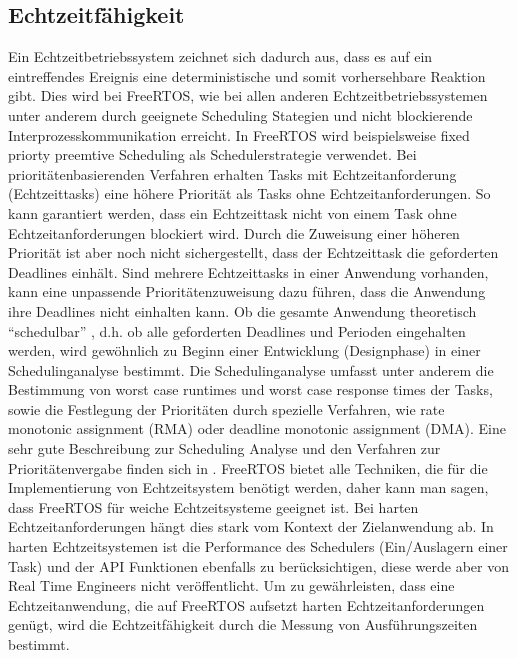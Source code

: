 \subsection{Echtzeitfähigkeit}
Ein Echtzeitbetriebssystem zeichnet sich dadurch aus, dass es auf ein eintreffendes Ereignis eine deterministische und somit vorhersehbare Reaktion gibt. Dies wird bei FreeRTOS, wie bei allen anderen Echtzeitbetriebssystemen unter anderem durch geeignete Scheduling Stategien und nicht blockierende Interprozesskommunikation erreicht\cite{9780128015070}\cite{Jones:1997:CRT:269005.266689}\cite{Regehr:2001:ACR:882481.883779}. In FreeRTOS wird beispielsweise fixed priorty preemtive Scheduling als Schedulerstrategie verwendet. Bei prioritätenbasierenden Verfahren erhalten Tasks mit Echtzeitanforderung (Echtzeittasks) eine höhere Priorität als Tasks ohne Echtzeitanforderungen. So kann garantiert werden, dass ein Echtzeittask nicht von einem Task ohne Echtzeitanforderungen blockiert wird. Durch die Zuweisung einer höheren Priorität ist aber noch nicht sichergestellt, dass der Echtzeittask die geforderten Deadlines einhält. Sind mehrere Echtzeittasks in einer Anwendung vorhanden, kann eine unpassende Prioritätenzuweisung dazu füh\-ren, dass die Anwendung ihre Deadlines nicht einhalten kann\cite{9780128015070}. Ob die gesamte Anwendung theoretisch "`schedulbar"' , d.h. ob alle geforderten Deadlines und Perioden eingehalten werden, wird gewöhnlich zu Beginn einer Entwicklung (Designphase) in einer Schedulinganalyse bestimmt. Die Schedulinganalyse umfasst unter anderem die Bestimmung von worst case runtimes und worst case response times der Tasks, sowie die Festlegung der Prioritäten durch spezielle Verfahren, wie rate monotonic assignment (RMA) oder deadline monotonic assignment (DMA). Eine sehr gute Beschreibung zur Scheduling Analyse und den Verfahren zur Prioritätenvergabe finden sich in \cite{9780128015070}.
FreeRTOS bietet alle Techniken, die für die Implementierung von Echtzeitsystem benötigt werden, daher kann man sagen, dass FreeRTOS für weiche Echtzeitsysteme geeignet ist. 
Bei harten Echtzeitanforderungen hängt dies stark vom Kontext der Zielanwendung ab. In harten Echtzeitsystemen ist die Performance des Schedulers (Ein/Auslagern einer Task) und der API Funktionen ebenfalls zu berücksichtigen, diese werde aber von Real Time Engineers nicht veröffentlicht. Um zu gewährleisten, dass eine Echtzeitanwendung, die auf FreeRTOS aufsetzt harten Echtzeitanforderungen genügt, wird die Echtzeitfähigkeit durch die Messung von Ausführungszeiten bestimmt\cite{RealTimePerformance}.  

